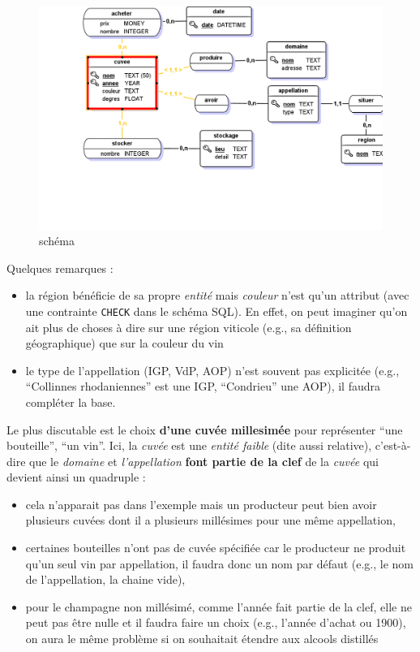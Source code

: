 \documentclass[11pt]{article}
\makeatletter
\def\maxwidth{\ifdim\Gin@nat@width>\linewidth\linewidth
    \else\Gin@nat@width\fi}
\let\Oldincludegraphics\includegraphics
\renewcommand{\includegraphics}[1]{\Oldincludegraphics[width=.8\maxwidth]{#1}}
\providecommand{\tightlist}{%
      \setlength{\itemsep}{0pt}\setlength{\parskip}{0pt}}
\makeatother
\begin{document}
\begin{figure}
\centering
\includegraphics{correction/cas_d_etude_modelisation.png}
\caption{schéma}
\end{figure}

Quelques remarques :

\begin{itemize}
\tightlist
\item
  la région bénéficie de sa propre \emph{entité} mais \emph{couleur}
  n'est qu'un attribut (avec une contrainte \texttt{CHECK} dans le
  schéma SQL). En effet, on peut imaginer qu'on ait plus de choses à
  dire sur une région viticole (e.g., sa définition géographique) que
  sur la couleur du vin
\item
  le type de l'appellation (IGP, VdP, AOP) n'est souvent pas explicitée
  (e.g., ``Collinnes rhodaniennes'' est une IGP, ``Condrieu'' une AOP),
  il faudra compléter la base.
\end{itemize}

Le plus discutable est le choix \textbf{d'une cuvée millesimée} pour
représenter ``une bouteille'', ``un vin''. Ici, la \emph{cuvée} est une
\emph{entité faible} (dite aussi relative), c'est-à-dire que le
\emph{domaine} et \emph{l'appellation} \textbf{font partie de la clef}
de la \emph{cuvée} qui devient ainsi un quadruple :

\begin{itemize}
\tightlist
\item
  cela n'apparait pas dans l'exemple mais un producteur peut bien avoir
  plusieurs cuvées dont il a plusieurs millésimes pour une même
  appellation,
\item
  certaines bouteilles n'ont pas de cuvée spécifiée car le producteur ne
  produit qu'un seul vin par appellation, il faudra donc un nom par
  défaut (e.g., le nom de l'appellation, la chaine vide),
\item
  pour le champagne non millésimé, comme l'année fait partie de la clef,
  elle ne peut pas être nulle et il faudra faire un choix (e.g., l'année
  d'achat ou 1900), on aura le même problème si on souhaitait étendre
  aux alcools distillés
\end{itemize}
\end{document}
